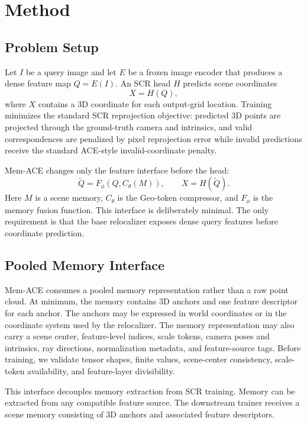 \documentclass[letterpaper]{article} %
\newcommand{\shortmethod}{Mem-ACE}
\newcommand{\geocomp}{Geo-token compressor}
\begin{document}
\section{Method}

\subsection{Problem Setup}

Let $I$ be a query image and let $E$ be a frozen image encoder that produces a dense feature map $Q=E(I)$. An SCR head $H$ predicts scene coordinates
\begin{equation}
    X = H(Q),
\end{equation}
where $X$ contains a 3D coordinate for each output-grid location. Training minimizes the standard SCR reprojection objective: predicted 3D points are projected through the ground-truth camera and intrinsics, and valid correspondences are penalized by pixel reprojection error while invalid predictions receive the standard ACE-style invalid-coordinate penalty.

\shortmethod{} changes only the feature interface before the head:
\begin{equation}
    \widetilde{Q} = F_{\phi}(Q, C_{\theta}(M)), \qquad X = H(\widetilde{Q}).
\end{equation}
Here $M$ is a scene memory, $C_{\theta}$ is the \geocomp{}, and $F_{\phi}$ is the memory fusion function. This interface is deliberately minimal. The only requirement is that the base relocalizer exposes dense query features before coordinate prediction.

\subsection{Pooled Memory Interface}

\shortmethod{} consumes a pooled memory representation rather than a raw point cloud. At minimum, the memory contains 3D anchors and one feature descriptor for each anchor. The anchors may be expressed in world coordinates or in the coordinate system used by the relocalizer. The memory representation may also carry a scene center, feature-level indices, scale tokens, camera poses and intrinsics, ray directions, normalization metadata, and feature-source tags. Before training, we validate tensor shapes, finite values, scene-center consistency, scale-token availability, and feature-layer divisibility.

This interface decouples memory extraction from SCR training. Memory can be extracted from any compatible feature source. The downstream trainer receives a scene memory consisting of 3D anchors and associated feature descriptors.
\end{document}
